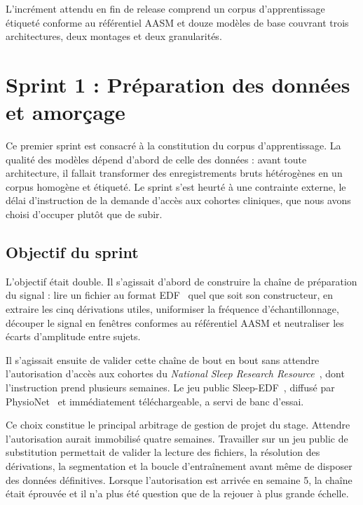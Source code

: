 L'incrément attendu en fin de release comprend un corpus d'apprentissage étiqueté conforme
au référentiel AASM et douze modèles de base couvrant trois architectures, deux montages et
deux granularités.

\section{Sprint 1 : Préparation des données et amorçage}
\label{sec:sprint1}

Ce premier sprint est consacré à la constitution du corpus d'apprentissage. La qualité
des modèles dépend d'abord de celle des données : avant toute architecture, il fallait
transformer des enregistrements bruts hétérogènes en un corpus homogène et étiqueté. Le
sprint s'est heurté à une contrainte externe, le délai d'instruction de la demande
d'accès aux cohortes cliniques, que nous avons choisi d'occuper plutôt que de subir.

\subsection{Objectif du sprint}

L'objectif était double. Il s'agissait d'abord de construire la chaîne de
préparation du signal : lire un fichier au format EDF~\cite{kemp1992} quel que soit son
constructeur,
en extraire les cinq dérivations utiles, uniformiser la fréquence d'échantillonnage,
découper le signal en fenêtres conformes au référentiel AASM et neutraliser les écarts
d'amplitude entre sujets.

Il s'agissait ensuite de valider cette chaîne de bout en bout sans attendre
l'autorisation d'accès aux cohortes du \emph{National Sleep Research
Resource}~\cite{zhang2018nsrr}, dont l'instruction prend plusieurs semaines. Le jeu
public Sleep-EDF~\cite{kemp2000}, diffusé par PhysioNet~\cite{goldberger2000} et
immédiatement téléchargeable, a servi de banc d'essai.

Ce choix constitue le principal arbitrage de gestion de projet du stage. Attendre
l'autorisation aurait immobilisé quatre semaines. Travailler
sur un jeu public de substitution permettait de valider la lecture des fichiers, la
résolution des dérivations, la segmentation et la boucle d'entraînement avant même de
disposer des données définitives. Lorsque l'autorisation est arrivée en semaine 5, la
chaîne était éprouvée et il n'a plus été question que de la rejouer à plus grande
échelle.

